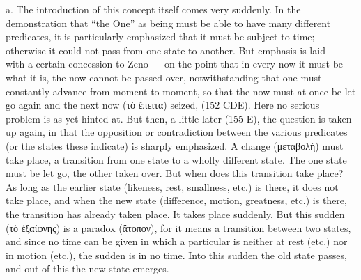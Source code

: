 \documentclass[12pt,a4paper,openany]{book}
\newcommand{\opage}[1]{\marginnote{\footnotesize\textit{[#1]}}}
\begin{document}
a. The introduction of this concept itself comes very
suddenly.  In the demonstration that ``the One'' as
being must be able to have many different predicates,
it is particularly emphasized that it must be subject to time;
otherwise it could not pass from one state to another.
But emphasis is laid --- with a certain concession to Zeno
--- on the point that in every now it must be what it is, the now
cannot be passed over, notwithstanding that one must constantly advance from
moment to moment, so that the now must at once be let go again and
the next now (τὸ ἔπειτα) seized, (152 CDE).  Here no serious
problem is as yet hinted at.  But then, a little later
(155 E), the question is taken up again, in that the opposition or
contradiction between the various predicates (or the states
these indicate) is sharply emphasized.  A change (μεταβολή) must take place, a transition from one state to a
wholly different state.  The one state must be let go, the
\setcounter{footnote}{0}%
\opage{39}other taken over.  But when does this transition take place?  As long as
the earlier state (likeness, rest, smallness, etc.)
is there, it does not take place, and when the new state (difference,
motion, greatness, etc.) is there, the transition has already
taken place.  It takes place suddenly.  But this sudden (τὸ ἐξαίφνης)
is a paradox (ἄτοπον), for it means a transition between
two states, and since no time can be given in
which a particular is neither at rest (etc.) nor in motion
(etc.), the sudden is in no time.
Into this sudden the old state passes, and out of
this the new state emerges.
\end{document}
